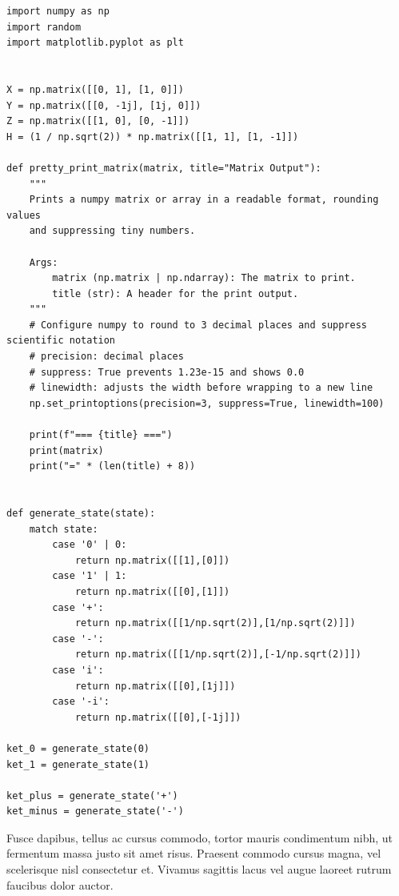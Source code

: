 \begin{lstlisting}[caption={Block code example}, label={lst:block_code_example_2}]
import numpy as np
import random
import matplotlib.pyplot as plt


X = np.matrix([[0, 1], [1, 0]])
Y = np.matrix([[0, -1j], [1j, 0]])
Z = np.matrix([[1, 0], [0, -1]])
H = (1 / np.sqrt(2)) * np.matrix([[1, 1], [1, -1]])

def pretty_print_matrix(matrix, title="Matrix Output"):
    """
    Prints a numpy matrix or array in a readable format, rounding values
    and suppressing tiny numbers.
    
    Args:
        matrix (np.matrix | np.ndarray): The matrix to print.
        title (str): A header for the print output.
    """
    # Configure numpy to round to 3 decimal places and suppress scientific notation
    # precision: decimal places
    # suppress: True prevents 1.23e-15 and shows 0.0
    # linewidth: adjusts the width before wrapping to a new line
    np.set_printoptions(precision=3, suppress=True, linewidth=100)
    
    print(f"=== {title} ===")
    print(matrix)
    print("=" * (len(title) + 8))


def generate_state(state):
    match state:
        case '0' | 0:
            return np.matrix([[1],[0]])
        case '1' | 1:
            return np.matrix([[0],[1]])
        case '+':
            return np.matrix([[1/np.sqrt(2)],[1/np.sqrt(2)]])
        case '-':     
            return np.matrix([[1/np.sqrt(2)],[-1/np.sqrt(2)]])
        case 'i':
            return np.matrix([[0],[1j]])
        case '-i':
            return np.matrix([[0],[-1j]])     

ket_0 = generate_state(0)
ket_1 = generate_state(1)

ket_plus = generate_state('+')
ket_minus = generate_state('-')
\end{lstlisting}
Fusce dapibus, tellus ac cursus commodo, tortor mauris condimentum nibh, ut fermentum massa justo sit amet risus. Praesent commodo cursus magna, vel scelerisque nisl consectetur et. Vivamus sagittis lacus vel augue laoreet rutrum faucibus dolor auctor.